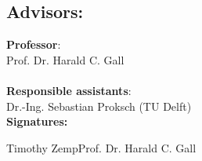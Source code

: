 \documentclass{task_description}
\begin{document}
\subsection*{Advisors:}

\noindent\textbf{Professor}: \\
\noindent Prof. Dr. Harald C. Gall \\
\\
\noindent\textbf{Responsible assistants}: \\
\noindent Dr.-Ing. Sebastian Proksch (TU Delft) \\


\vspace{2em}
\noindent\textbf{Signatures:}

\vspace{3\baselineskip}
\noindent Timothy Zemp\hfill Prof. Dr. Harald C. Gall
\clearpage
\label{gantt}


\end{document}
